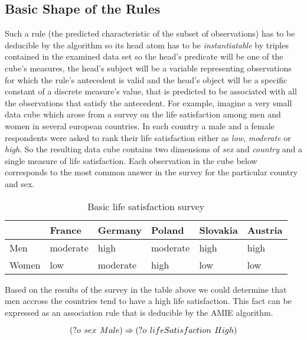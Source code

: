 \subsection{Basic Shape of the Rules}

Such a rule (the predicted characteristic of the subset of observations) has to be deducible by the algorithm so its head atom has to be \textit{instantiatable} by triples contained in the examined data set so the head's predicate will be one of the cube's measures, the head's subject will be a variable representing observations for which the rule's antecedent is valid and the head's object will be a specific constant of a discrete measure's value, that is predicted to be associated with all the observations that satisfy the antecedent. For example, imagine a very small data cube which arose from a survey on the life satisfaction among men and women in several european countries. In each country a male and a female respondents were asked to rank their life satisfaction either as \textit{low}, \textit{moderate} or \textit{high}. So the resulting data cube contains two dimensions of \textit{sex} and \textit{country} and a single measure of life satisfaction. Each observation in the cube below corresponds to the most common answer in the survey for the particular country and sex. 

\begin{table}[h]
\centering
\begin{tabular}{l|lllll}
    & France & Germany & Poland & Slovakia & Austria  \\ 
\hline
Men   & moderate     & high       & moderate      & high        & high        \\
Women & low      & moderate       & high      & low        & low       
\end{tabular}
\caption{Basic life satisfaction survey}\label{table1}
\end{table}


Based on the results of the survey in the table above we could determine that men accross the countries tend to have a high life satisfaction. This fact can be expressed as an association rule that is deducible by the AMIE algorithm.

\begin{equation}\label{rule1}
    (?o\hspace{0.4em}sex\hspace{0.4em}Male) \Rightarrow (?o\hspace{0.4em}lifeSatisfaction\hspace{0.4em}High) 
\end{equation}

